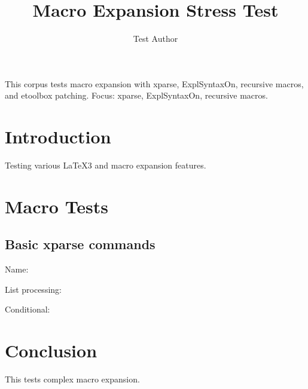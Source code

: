 \documentclass{article}
\title{Macro Expansion Stress Test}
\author{Test Author}
\begin{document}
\maketitle

\begin{abstrct}
This corpus tests macro expansion with xparse, ExplSyntaxOn, recursive macros,
and etoolbox patching.
Focus: xparse, ExplSyntaxOn, recursive macros.
\end{abstrct}

\section{Introduction}

Testing various LaTeX3 and macro expansion features.

\section{Macro Tests}

\subsection{Basic xparse commands}

Name: 

List processing: 

Conditional: 

\section{Conclusion}

This tests complex macro expansion.
\end{document}
